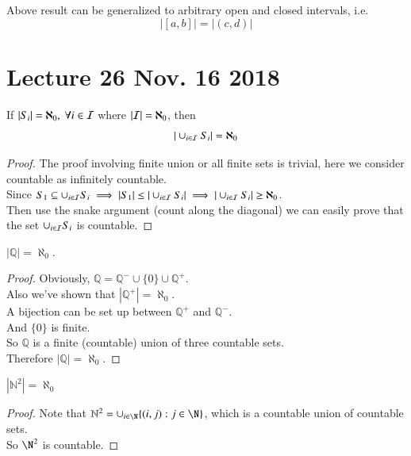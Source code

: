 \documentclass[10pt]{article}
\begin{document}
		\begin{proposition}
			Above result can be generalized to arbitrary open and closed intervals, i.e.
			\[
				|[a,b]| = |(c,d)|
			\]
		\end{proposition}
	\section{Lecture 26 Nov. 16 2018}
		\begin{theorem}
			If $|S_i| = \aleph_0,\ \forall i \in \mathcal{{I}}$ where $|\mathcal{{I}}| = \aleph_0$, then
			\[
				|\cup_{i\in\mathcal{{I}}}S_i| = \aleph_0
			\]
		\end{theorem}
		\begin{proof}
			The proof involving finite union or all finite sets is trivial, here we consider countable as infinitely countable.\\
			Since $S_1 \subseteq \cup_{i\in\mathcal{{I}}}S_i \implies |S_1| \leq |\cup_{i\in\mathcal{{I}}}S_i| \implies |\cup_{i\in\mathcal{{I}}}S_i| \geq \aleph_0$. \\
			Then use the snake argument (count along the diagonal) we can easily prove that the set $\cup_{i\in\mathcal{{I}}}S_i$ is countable.
		\end{proof}
		\begin{example}
			$|\mathbb{Q}|=\aleph_0$.
			\begin{proof}
				Obviously, $\mathbb{Q} = \mathbb{Q}^- \cup \{0\} \cup \mathbb{Q}^+$. \\
				Also we've shown that $|\mathbb{Q}^+| = \aleph_0$. \\
				A bijection can be set up between $\mathbb{Q}^+$ and $\mathbb{Q}^-$. \\
				And $\{0\}$ is finite. \\
				So $\mathbb{Q}$ is a finite (countable) union of three countable sets. \\
				Therefore $|\mathbb{Q}| = \aleph_0$.
			\end{proof}
		\end{example}
		
		\begin{example}
			$|\mathbb{N}^2| = \aleph_0$ 
			\begin{proof}
				Note that $\mathbb{N}^2 = \cup_{i\in \N}\{(i,j):j\in \N\}$, which is a countable union of countable sets. \\
				So $\N^2$ is countable.
			\end{proof}
		\end{example}
		
\end{document}
